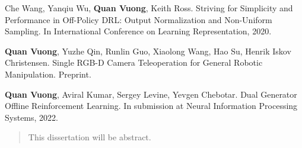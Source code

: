 \begin{frontmatter}
\begin{vitapage}
\begin{publications}
   \item Che Wang, Yanqiu Wu, \textbf{Quan Vuong}, Keith Ross. Striving for Simplicity and Performance in Off-Policy DRL: Output Normalization and Non-Uniform Sampling. In International Conference on Learning Representation, 2020.
   \item \textbf{Quan Vuong}, Yuzhe Qin, Runlin Guo, Xiaolong Wang, Hao Su, Henrik Iskov Christensen. Single RGB-D Camera Teleoperation for General Robotic Manipulation. Preprint.
   \item \textbf{Quan Vuong}, Aviral Kumar, Sergey Levine, Yevgen Chebotar. Dual Generator Offline Reinforcement Learning. In submission at Neural Information Processing Systems, 2022.
\end{publications}
\end{vitapage}


%
%
\begin{abstract}
  This dissertation will be abstract.
\end{abstract}


\end{frontmatter}
